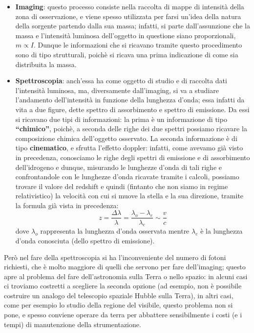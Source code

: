 \begin{itemize}
	\item \textbf{Imaging}: questo processo consiste nella raccolta di mappe di intensità della zona di osservazione, e viene spesso utilizzata per farsi un'idea della natura della sorgente partendo dalla sua massa; infatti, si parte dall'assunzione che la massa e l'intensità luminosa dell'oggetto in questione siano proporzionali, $m \propto I$. Dunque le informazioni che si ricavano tramite questo procedimento sono di tipo strutturali, poichè si ricava una prima indicazione di come sia distribuita la massa.
	\item \textbf{Spettroscopia}: anch'essa ha come oggetto di studio e di raccolta dati l'intensità luminosa, ma, diversamente dall'imaging, si va a studiare l'andamento dell'intensità in funzione della lunghezza d'onda; essa infatti da vita a due  figure, dette spettro di assorbimento e spettro di emissione. Da essi si ricavano due tipi di informazioni: la prima è un informazione di tipo \textbf{``chimico''}, poichè, a seconda delle righe dei due spettri possiamo ricavare la composizione chimica dell'oggetto osservato. La seconda informazione è di tipo \textbf{cinematico}, e sfrutta l'effetto doppler: infatti, come avevamo già visto in precedenza, conosciamo le righe degli spettri di emissione e di assorbimento dell'idrogeno e dunque, misurando le lunghezze d'onda di tali righe e confrontandole con le lunghezze d'onda ricavate tramite i calcoli, possiamo trovare il valore del redshift e quindi (fintanto che non siamo in regime relativistico) la velocità con cui si muove la stella e la sua direzione, tramite la formula già vista in precedenza:
	$$z=\frac{\Delta \lambda}{\lambda}=\frac{\lambda_o - \lambda_e}{\lambda_e} \sim \frac{v}{c}$$
	dove $\lambda_o$ rappresenta la lunghezza d'onda osservata mentre $\lambda_e$ è la lunghezza d'onda conosciuta (dello spettro di emissione). 
\end{itemize}

Però nel fare della spettroscopia si ha l'inconveniente del numero di fotoni richiesti, che è molto maggiore di quelli che servono per fare dell'imaging; questo apre al problema del fare dell'astronomia sulla Terra o nello spazio: in alcuni casi ci troviamo costretti a scegliere la seconda opzione (ad esempio, non è possibile costruire un analogo del telescopio spaziale Hubble sulla Terra), in altri casi, come per esempio lo studio della regione del visibile, questo problema non si pone, e spesso conviene operare da terra per abbattere sensibilmente i costi (e i tempi) di manutenzione della strumentazione.

